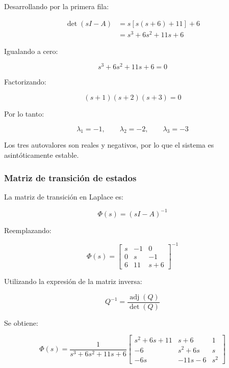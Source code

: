 \documentclass[12pt,a4paper]{article}
\begin{document}
Desarrollando por la primera fila:

\begin{align}\det(sI-A)&=s\left[s(s+6)+11\right]+6\\&=s^3+6s^2+11s+6\end{align}

Igualando a cero:

\begin{equation}s^3+6s^2+11s+6=0\end{equation}

Factorizando:

\begin{equation}(s+1)(s+2)(s+3)=0\end{equation}

Por lo tanto:

\begin{equation}\boxed{\lambda_1=-1,\qquad \lambda_2=-2,\qquad \lambda_3=-3}\end{equation}

Los tres autovalores son reales y negativos, por lo que el sistema es asintóticamente estable.
\subsubsection*{Matriz de transición de estados}
La matriz de transición en Laplace es:

\begin{equation}\Phi(s)=(sI-A)^{-1}\end{equation}

Reemplazando:

\begin{equation}\Phi(s)=\begin{bmatrix}s&-1&0\\0&s&-1\\6&11&s+6\end{bmatrix}^{-1}\end{equation}

Utilizando la expresión de la matriz inversa:

\begin{equation}Q^{-1}=\frac{\operatorname{adj}(Q)}{\det(Q)}\end{equation}

Se obtiene:

\begin{equation}\Phi(s)=\frac{1}{s^3+6s^2+11s+6} \begin{bmatrix}s^2+6s+11&s+6&1\\-6&s^2+6s&s\\-6s&-11s-6&s^2\end{bmatrix}\end{equation}
\end{document}

